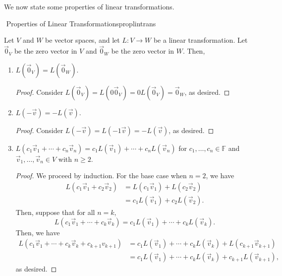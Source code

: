         \pagebreak
        \vphantom
        \\
        \\
        We now state some properties of linear transformations.
        \begin{theorem}{\Stop\,\,Properties of Linear Transformations}{proplintrans}

            Let \(V\) and \(W\) be vector spaces, and let \(L:V\to W\) be a linear transformation. Let \(\vec{0}_V\) be the zero vector in \(V\) and \(\vec{0}_W\) be the zero vector in \(W\). Then,
            \begin{enumerate}
                \item \(L(\vec{0}_V)=L(\vec{0}_W)\).
                \begin{proof}
                    Consider \(L(\vec{0}_V)=L(0\vec{0}_V)=0L(\vec{0}_V)=\vec{0}_W\), as desired.
                \end{proof}
                \item \(L(-\vec{v})=-L(\vec{v})\).
                \begin{proof}
                    Consider \(L(-\vec{v})=L(-1\vec{v})=-L(\vec{v})\), as desired.
                \end{proof}
                \item \(L(c_1\vec{v}_1+\cdots+c_n\vec{v}_n)=c_1L(\vec{v}_1)+\cdots+c_nL(\vec{v}_n)\) for \(c_1,\ldots,c_n\in\mathbb{F}\) and \(\vec{v}_1,\ldots,\vec{v}_n\in V\) with \(n\geq2\).
                \begin{proof}
                    We proceed by induction. For the base case when \(n=2\), we have
                    \begin{align*}
                        L(c_1\vec{v}_1+c_2\vec{v}_2)&=L(c_1\vec{v}_1)+L(c_2\vec{v}_2) \\
                        &=c_1L(\vec{v}_1)+c_2L(\vec{v}_2).
                    \end{align*}
                    Then, suppose that for all \(n=k\), 
                    \begin{equation*}
                        L(c_1\vec{v}_1+\cdots+c_k\vec{v}_k)=c_1L(\vec{v}_1)+\cdots+c_kL(\vec{v}_k).
                    \end{equation*}
                    Then, we have
                    \begin{align*}
                        L(c_1\vec{v}_1+\cdots+c_k\vec{v}_k+c_{k+1}v_{k+1})&=c_1L(\vec{v}_1)+\cdots+c_kL(\vec{v}_k)+L(c_{k+1}\vec{v}_{k+1}) \\
                        &=c_1L(\vec{v}_1)+\cdots+c_kL(\vec{v}_k)+c_{k+1}L(\vec{v}_{k+1}),
                    \end{align*}
                    as desired.
                \end{proof}
            \end{enumerate}
            
        \end{theorem}
